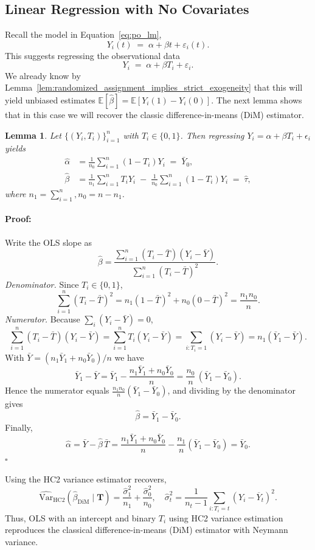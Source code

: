 \documentclass[11pt]{exam}
\theoremstyle{plain}
\newtheorem{lemma}{Lemma}
\newenvironment{proof}{\paragraph{Proof:}}{\hfill$\square$}
\newcommand{\E}{\mathbb{E}}
\newcommand{\Var}{\mathrm{Var}}
\begin{document}
\subsection{Linear Regression with No Covariates}
Recall the model in Equation~\eqref{eq:po_lm},
\[
Y_i(t) \;=\; \alpha + \beta t + \varepsilon_i(t).
\]
This suggests regressing the observational data
\[
Y_i \;=\; \alpha + \beta T_i + \varepsilon_i.
\]
We already know by Lemma~\ref{lem:randomized_assignment_implies_strict_exogeneity} that this will yield unbiased estimates $\E[\hat\beta] = \E[Y_i(1) - Y_i(0)]$. The next lemma shows that in this case we will recover the classic difference-in-means (DiM) estimator.
\begin{lemma}
Let $\{(Y_i,T_i)\}_{i=1}^n$ with $T_i\in\{0,1\}$. Then regressing $Y_i = \alpha + \beta T_i + \epsilon_i$
yields
\begin{align*}
\hat\alpha &= \frac{1}{n_0}\sum_{i=1}^n (1-T_i)Y_i \;=\; \bar Y_{0},\\
\hat\beta  &= \frac{1}{n_1}\sum_{i=1}^n T_i Y_i \;-\; \frac{1}{n_0}\sum_{i=1}^n (1-T_i)Y_i \;=\; \widehat\tau,
\end{align*}
where $n_1 = \sum_{i=1}^n, n_0 = n - n_1$.
\end{lemma}

\begin{proof}
Write the OLS slope as
\[
\hat\beta
=\frac{\sum_{i=1}^n (T_i-\bar T)(Y_i-\bar Y)}{\sum_{i=1}^n (T_i-\bar T)^2}.
\]
\emph{Denominator.} Since $T_i\in\{0,1\}$,
\[
\sum_{i=1}^n (T_i-\bar T)^2
= n_1(1-\bar T)^2+n_0(0-\bar T)^2
= \frac{n_1n_0}{n}.
\]
\emph{Numerator.} Because $\sum_i (Y_i-\bar Y)=0$,
\[
\sum_{i=1}^n (T_i-\bar T)(Y_i-\bar Y)
= \sum_{i=1}^n T_i(Y_i-\bar Y)
= \sum_{i:T_i=1} (Y_i-\bar Y)
= n_1(\bar Y_1-\bar Y).
\]
With $\bar Y=(n_1\bar Y_1+n_0\bar Y_0)/n$ we have
\[
\bar Y_1-\bar Y
= \bar Y_1-\frac{n_1\bar Y_1+n_0\bar Y_0}{n}
= \frac{n_0}{n}\,(\bar Y_1-\bar Y_0).
\]
Hence the numerator equals $\tfrac{n_1n_0}{n}(\bar Y_1-\bar Y_0)$, and dividing by the denominator gives
\[
\hat\beta=\bar Y_1-\bar Y_0.
\]
Finally,
\[
\hat\alpha=\bar Y-\hat\beta\,\bar T
= \frac{n_1\bar Y_1+n_0\bar Y_0}{n}-\frac{n_1}{n}(\bar Y_1-\bar Y_0)
= \bar Y_0.
\]
\end{proof}

Using the HC2 variance estimator recovers,
\[
\widehat{\Var}_{\mathrm{HC2}}(\hat\beta_{\text{DiM}} \mid \bm{T}) = 
\frac{\hat\sigma_1^2}{n_1} + \frac{\hat\sigma_0^2}{n_0}, 
\quad 
\hat\sigma_t^2 = \frac{1}{n_t-1}\sum_{i:T_i=t}(Y_i-\overline{Y}_t)^2.
\]
Thus, OLS with an intercept and binary \(T_i\) using HC2 variance estimation reproduces the classical difference-in-means (DiM) estimator with Neymann variance.
\end{document}
